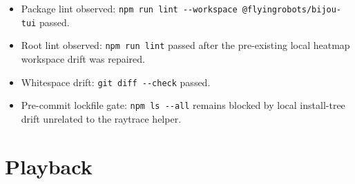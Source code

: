 \begin{itemize}
\item
  Package lint observed: \texttt{n\allowbreak{}p\allowbreak{}m\allowbreak{} \allowbreak{}r\allowbreak{}u\allowbreak{}n\allowbreak{} \allowbreak{}l\allowbreak{}i\allowbreak{}n\allowbreak{}t\allowbreak{} \allowbreak{}-\allowbreak{}-\allowbreak{}w\allowbreak{}o\allowbreak{}r\allowbreak{}k\allowbreak{}s\allowbreak{}p\allowbreak{}a\allowbreak{}c\allowbreak{}e\allowbreak{} \allowbreak{}@\allowbreak{}f\allowbreak{}l\allowbreak{}y\allowbreak{}i\allowbreak{}n\allowbreak{}g\allowbreak{}r\allowbreak{}o\allowbreak{}b\allowbreak{}o\allowbreak{}t\allowbreak{}s\allowbreak{}/\allowbreak{}b\allowbreak{}i\allowbreak{}j\allowbreak{}o\allowbreak{}u\allowbreak{}-\allowbreak{}t\allowbreak{}u\allowbreak{}i} passed.
\item
  Root lint observed: \texttt{n\allowbreak{}p\allowbreak{}m\allowbreak{} \allowbreak{}r\allowbreak{}u\allowbreak{}n\allowbreak{} \allowbreak{}l\allowbreak{}i\allowbreak{}n\allowbreak{}t} passed after the pre-existing local heatmap workspace drift was repaired.
\item
  Whitespace drift: \texttt{g\allowbreak{}i\allowbreak{}t\allowbreak{} \allowbreak{}d\allowbreak{}i\allowbreak{}f\allowbreak{}f\allowbreak{} \allowbreak{}-\allowbreak{}-\allowbreak{}c\allowbreak{}h\allowbreak{}e\allowbreak{}c\allowbreak{}k} passed.
\item
  Pre-commit lockfile gate: \texttt{n\allowbreak{}p\allowbreak{}m\allowbreak{} \allowbreak{}l\allowbreak{}s\allowbreak{} \allowbreak{}-\allowbreak{}-\allowbreak{}a\allowbreak{}l\allowbreak{}l} remains blocked by local install-tree drift unrelated to the raytrace helper.
\end{itemize}

\section{Playback}\label{record-159-playback}

